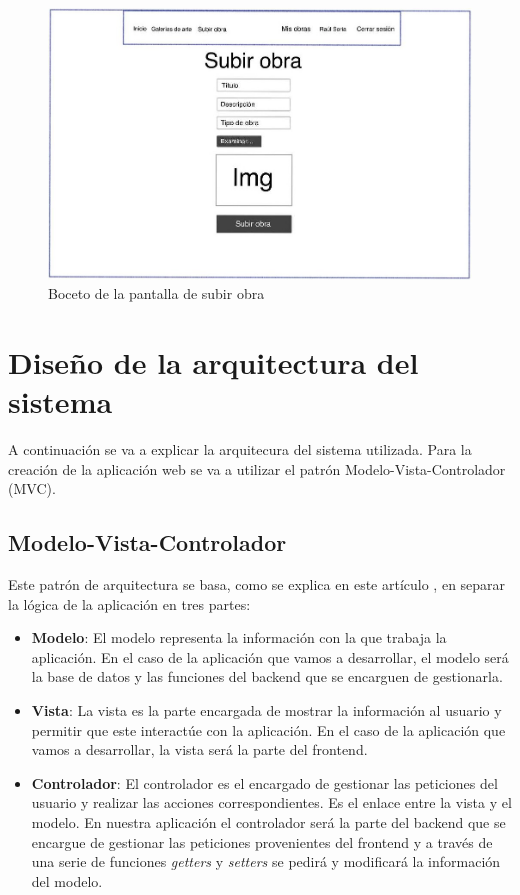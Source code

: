 \begin{figure}[H]
  \centering
  \includegraphics[width=\textwidth]{img/subir-obra}
  \caption{Boceto de la pantalla de subir obra}
  \label{fig:boceto-subir-obra}
\end{figure}

\section{Diseño de la arquitectura del sistema}
A continuación se va a explicar la arquitecura del sistema utilizada.
Para la creación de la aplicación web se va a utilizar el patrón
Modelo-Vista-Controlador (MVC).

\subsection{Modelo-Vista-Controlador}
Este patrón de arquitectura se basa, como se explica en este artículo \cite{mvc},
en separar la lógica de la aplicación en tres partes:

\begin{itemize}
    \item \textbf{Modelo}: El modelo representa la información con la que trabaja
    la aplicación. En el caso de la aplicación que vamos a desarrollar, el modelo
    será la base de datos y las funciones del backend que se encarguen de gestionarla.
    \item \textbf{Vista}: La vista es la parte encargada de mostrar la información
    al usuario y permitir que este interactúe con la aplicación. En el caso de la
    aplicación que vamos a desarrollar, la vista será la parte del frontend.
    \item \textbf{Controlador}: El controlador es el encargado de gestionar las
    peticiones del usuario y realizar las acciones correspondientes. Es el enlace
    entre la vista y el modelo. En nuestra aplicación el controlador será la parte
    del backend que se encargue de gestionar las peticiones provenientes del frontend
    y a través de una serie de funciones \textit{getters} y \textit{setters} se
    pedirá y modificará la información del modelo.
\end{itemize}

